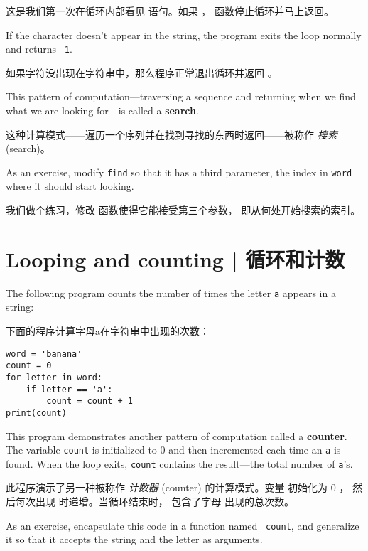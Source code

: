 这是我们第一次在循环内部看见  语句。如果 ，
函数停止循环并马上返回。

If the character doesn't appear in the string, the program
exits the loop normally and  returns {\tt -1}.

如果字符没出现在字符串中，那么程序正常退出循环并返回 。

This pattern of computation---traversing a sequence and returning
when we find what we are looking for---is called a {\bf search}.
    

这种计算模式——遍历一个序列并在找到寻找的东西时返回——被称作 {\em 搜索} (search)。

As an exercise, modify {\tt find} so that it has a
third parameter, the index in {\tt word} where it should start
looking.

我们做个练习，修改  函数使得它能接受第三个参数， 即从何处开始搜索的索引。

\section{Looping and counting  |  循环和计数}
\label{counter}
  
  

The following program counts the number of times the letter {\tt a}
appears in a string:

下面的程序计算字母a在字符串中出现的次数：

\begin{lstlisting}
word = 'banana'
count = 0
for letter in word:
    if letter == 'a':
        count = count + 1
print(count)
\end{lstlisting}

%
This program demonstrates another pattern of computation called a {\bf
counter}.  The variable {\tt count} is initialized to 0 and then
incremented each time an {\tt a} is found.
When the loop exits, {\tt count}
contains the result---the total number of {\tt a}'s.

此程序演示了另一种被称作 {\em 计数器} (counter) 的计算模式。变量  初始化为 0 ， 然后每次出现  时递增。当循环结束时， 包含了字母  出现的总次数。

As an exercise, encapsulate this code in a function named {\tt
count}, and generalize it so that it accepts the string and the
letter as arguments.


